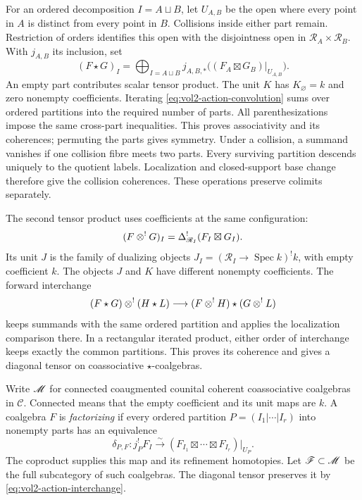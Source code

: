 For an ordered decomposition $I=A\sqcup B$, let $U_{A,B}$ be the open
where every point in $A$ is distinct from every point in $B$.
Collisions inside either part remain. Restriction of orders identifies
this open with the disjointness open in
$\mathscr R_A\times\mathscr R_B$. With $j_{A,B}$ its inclusion, set
\begin{equation}\label{eq:vol2-action-convolution}
 (F\star G)_I=
 \bigoplus_{I=A\sqcup B}
 j_{A,B,*}\bigl((F_A\boxtimes G_B)|_{U_{A,B}}\bigr).
\end{equation}
An empty part contributes scalar tensor product. The unit $K$ has
$K_\varnothing=k$ and zero nonempty coefficients. Iterating
\eqref{eq:vol2-action-convolution} sums over ordered partitions into
the required number of parts. All parenthesizations impose the same
cross-part inequalities. This proves associativity and its coherences;
permuting the parts gives symmetry. Under a collision, a summand
vanishes if one collision fibre meets two parts. Every surviving
partition descends uniquely to the quotient labels. Localization and
closed-support base change therefore give the collision coherences.
These operations preserve colimits separately.

The second tensor product uses coefficients at the same configuration:
\[
 (F\mathbin{\otimes^!} G)_I=\Delta_{\mathscr R_I}^!(F_I\boxtimes G_I).
\]
Its unit $J$ is the family of dualizing objects
$J_I=(\mathscr R_I\to\operatorname{Spec}k)^!k$, with empty
coefficient $k$. The objects $J$ and $K$ have different nonempty
coefficients. The forward interchange
\begin{equation}\label{eq:vol2-action-interchange}
 (F\star G)\mathbin{\otimes^!}(H\star L)\longrightarrow
       (F\mathbin{\otimes^!} H)\star(G\mathbin{\otimes^!} L)
\end{equation}
keeps summands with the same ordered partition and applies the
localization comparison there. In a rectangular iterated product,
either order of interchange keeps exactly the common partitions.
This proves its coherence and gives a diagonal tensor on
coassociative $\star$-coalgebras.

Write $\mathscr M$ for connected coaugmented counital coherent
coassociative coalgebras in $\mathscr C$. Connected means that the
empty coefficient and its unit maps are $k$. A coalgebra $F$ is
\emph{factorizing} if every ordered partition
$P=(I_1|\cdots|I_r)$ into nonempty parts has an equivalence
\begin{equation}\label{eq:vol2-action-factorization}
 \delta_{P,F}:j_P^!F_I\xrightarrow{\sim}
       (F_{I_1}\boxtimes\cdots\boxtimes F_{I_r})|_{U_P}.
\end{equation}
The coproduct supplies this map and its refinement homotopies.
Let $\mathscr F\subset\mathscr M$ be the full subcategory of such coalgebras.
The diagonal tensor preserves it by
\eqref{eq:vol2-action-interchange}.

